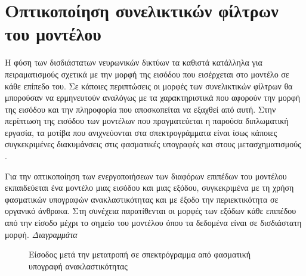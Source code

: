 \section{Οπτικοποίηση συνελικτικών φίλτρων του μοντέλου}
Η φύση των δισδιάστατων νευρωνικών δικτύων τα καθιστά κατάλληλα για πειραματισμούς σχετικά με την μορφή της εισόδου που εισέρχεται στο μοντέλο σε κάθε επίπεδο του. Σε κάποιες περιπτώσεις οι μορφές των συνελικτικών φίλτρων θα μπορούσαν να ερμηνευτούν αναλόγως με τα χαρακτηριστικά που αφορούν την μορφή της εισόδου και την πληροφορία που αποσκοπείται να εξαχθεί από αυτή. Στην περίπτωση της εισόδου των μοντέλων που πραγματεύεται η παρούσα διπλωματική εργασία, τα μοτίβα που ανιχνεύονται στα σπεκτρογράμματα είναι ίσως κάποιες συγκεκριμένες διακυμάνσεις στις φασματικές υπογραφές και στους μετασχηματισμούς .

Για την οπτικοποίηση των ενεργοποιήσεων των διαφόρων επιπέδων του μοντέλου εκπαιδεύεται ένα μοντέλο μιας εισόδου και μιας εξόδου, συγκεκριμένα  με τη χρήση φασματικών υπογραφών ανακλαστικότητας και με έξοδο την περιεκτικότητα σε οργανικό άνθρακα. Στη συνέχεια παρατίθενται οι μορφές των εξόδων κάθε επιπέδου από την είσοδο μέχρι το σημείο του μοντέλου όπου τα δεδομένα είναι σε δισδιάστατη μορφή.
\textit{Διαγραμμάτα}
\begin{figure}[H]
  \begin{center}
    
    \caption{Είσοδος μετά την μετατροπή σε σπεκτρόγραμμα από φασματική υπογραφή ανακλαστικότητας}
  \end{center}
\end{figure}

%
%    

